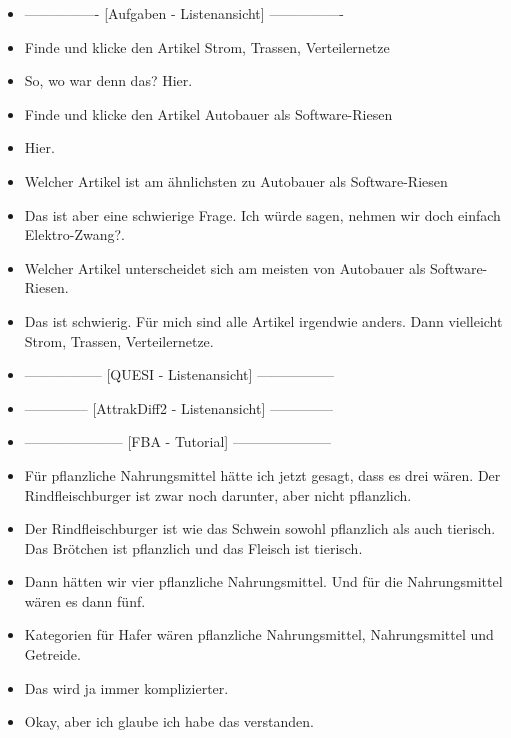 {\begin{itemize}[]
              Die spielen im Thema E-Mobilität auch eine große Rolle, würde ich jetzt mal so behaupten.
        \item {----------------} [Aufgaben - Listenansicht] {----------------}
        \item {} Finde und klicke den Artikel \flqq Strom, Trassen, Verteilernetze\frqq{}
        \item {} So, wo war denn das? Hier.
        \item {} Finde und klicke den Artikel \flqq Autobauer als Software-Riesen\frqq{}
        \item {} Hier.
        \item {} Welcher Artikel ist am ähnlichsten zu \flqq Autobauer als Software-Riesen\frqq{}
        \item {} Das ist aber eine schwierige Frage. Ich würde sagen, nehmen wir doch einfach \flqq Elektro-Zwang?\frqq{}.
        \item {} Welcher Artikel unterscheidet sich am meisten von \flqq Autobauer als Software-Riesen\frqq{}.
        \item {} Das ist schwierig. Für mich sind alle Artikel irgendwie anders. Dann vielleicht \flqq Strom, Trassen, Verteilernetze\frqq{}.
        \item {-----------------} [QUESI - Listenansicht] {-----------------}
        \item {--------------} [AttrakDiff2 - Listenansicht] {--------------}
        \item {---------------------} [FBA - Tutorial] {---------------------}
        \item {} Für pflanzliche Nahrungsmittel hätte ich jetzt gesagt, dass es drei wären.
              Der Rindfleischburger ist zwar noch darunter, aber nicht pflanzlich.
        \item {} Der Rindfleischburger ist wie das Schwein sowohl pflanzlich als auch tierisch. Das Brötchen ist pflanzlich und das Fleisch ist tierisch.
        \item {} Dann hätten wir vier pflanzliche Nahrungsmittel. Und für die Nahrungsmittel wären es dann fünf.
        \item {} Kategorien für Hafer wären pflanzliche Nahrungsmittel, Nahrungsmittel und Getreide.
        \item {} Das wird ja immer komplizierter.
        \item {} Okay, aber ich glaube ich habe das verstanden.

\end{itemize}}
